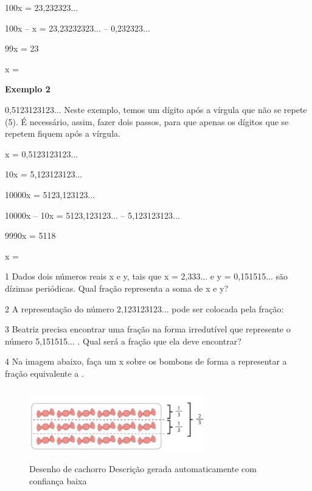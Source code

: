 \begin{escolha}
{100x = 23,232323...

100x -- x = 23,23232323... -- 0,232323...

99x = 23

x = \

\textbf{Exemplo 2} 

0,5123123123...
Neste exemplo, temos um dígito após a vírgula que não se repete (5). 
É necessário, assim, fazer dois passos, para que apenas os
dígitos que se repetem fiquem após a vírgula.

x = 0,5123123123...

10x = 5,123123123...

10000x = 5123,123123...

10000x -- 10x = 5123,123123... -- 5,123123123...

9990x = 5118

x = 
}



\num{1} Dados dois números reais x e y, tais que x = 2,333... e y =
0,151515... são dízimas periódicas. Qual fração representa a soma de x
e y?


\num{2} A representação do número 2,123123123... pode ser colocada pela
fração:


\num{3} Beatriz precisa encontrar uma fração na forma irredutível que
represente o número 5,151515... . Qual será a fração que ela deve
encontrar?


\num{4} Na imagem abaixo, faça um x sobre os bombons de forma a
representar a fração equivalente a .


\begin{figure}
\centering
\includegraphics[width=2.9871in,height=1.23958in]{./_SAEB_9_MAT/media/image43.png}
\caption{Desenho de cachorro Descrição gerada automaticamente com
confiança baixa}
\end{figure}


\end{escolha}

